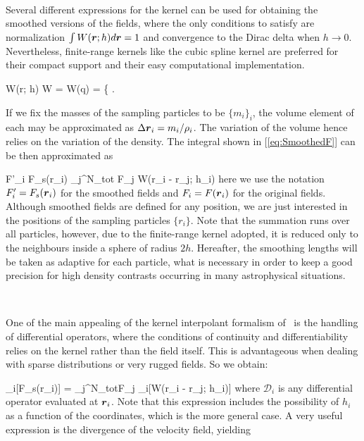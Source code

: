 \documentclass[a4,useAMS,usenatbib,usegraphicx,12pt]{article}
\begin{document}
\

Several different expressions for the kernel can be used for obtaining the 
smoothed versions of the fields, where the only conditions to satisfy are 
normalization $\int W(\boldsymbol{ r }; h)d\boldsymbol{ r }= 1$ and convergence to the Dirac delta 
when $h\rightarrow 0$. Nevertheless, finite-range kernels like the cubic spline 
kernel are preferred for their compact support and their easy computational 
implementation.

{ W(r; h) \equiv W = W(q) = 
\left\{  \right. }

If we fix the masses of the sampling particles to be $\{m_i\}_i$, the volume
element of each may be approximated as $\Delta \boldsymbol{ r }_i = m_i/\rho_i$. The 
variation of the volume hence relies on the variation of the density. The 
integral shown in [\ref{eq:SmoothedF}] can be then approximated as

{ F'_i \equiv F_s(\bds r_i) \approx \sum_j^{N_{tot}} F_j 
W(\bds r_i - \bds r_j; h_i) }
here we use the notation $F'_i = F_s(\boldsymbol{ r }_i)$ for the smoothed fields and $F_i 
= F(\boldsymbol{ r }_i)$ for the original fields. Although smoothed fields are defined
for any position, we are just interested in the positions of the sampling 
particles $\{r_i\}$. Note that the summation runs over all particles, however, 
due to the finite-range kernel adopted, it is reduced only to the neighbours 
inside a sphere of radius $2h$. Hereafter, the smoothing lengths will be taken 
as adaptive for each particle, what is necessary in order to keep a good 
precision for high density contrasts occurring in many astrophysical situations.

\

One of the main appealing of the kernel interpolant formalism of \SPH\ is the
handling of differential operators, where the conditions of continuity and 
differentiability relies on the kernel rather than the field itself. This is 
advantageous when dealing with sparse distributions or very rugged fields. So
we obtain:

{ _i[F_s(\bds r_i)] = \sum_j^{N_{tot}}F_j 
_i[W(\bds r_i - \bds r_j; h_i)] }
where $\mathcal{D}_i$ is any differential operator evaluated at $\boldsymbol{ r }_i$. Note
that this expression includes the possibility of $h_i$ as a function of the 
coordinates, which is the more general case. A very useful expression is the 
divergence of the velocity field, yielding
\end{document}
